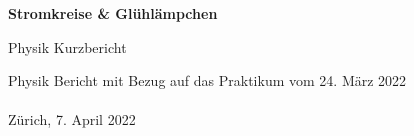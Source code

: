 \begin{titlepage}

    \begin{center}
        \vspace*{8cm}
        \Huge
        \textbf{Stromkreise \& Glühlämpchen}
 
        \vspace{0.5cm}
        \LARGE
        Physik Kurzbericht  
    \end{center}
    \vspace*{8cm}
    \normalsize
    \hspace*{2cm}Physik Bericht mit Bezug auf das Praktikum vom 24. März 2022\\\\
    \hspace*{2cm}Zürich, 7. April 2022
    
             
 \end{titlepage}